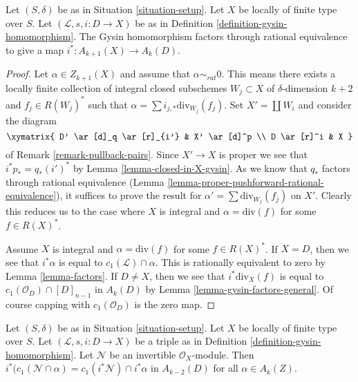 \begin{lemma}
\label{lemma-gysin-factors}
Let $(S, \delta)$ be as in Situation \ref{situation-setup}.
Let $X$ be locally of finite type over $S$.
Let $(\mathcal{L}, s, i : D \to X)$ be as in
Definition \ref{definition-gysin-homomorphism}.
The Gysin homomorphism factors through rational equivalence to
give a map $i^* : A_{k + 1}(X) \to A_k(D)$.
\end{lemma}

\begin{proof}
Let $\alpha \in Z_{k + 1}(X)$ and assume that $\alpha \sim_{rat} 0$.
This means there exists a locally finite collection of integral
closed subschemes $W_j \subset X$ of $\delta$-dimension $k + 2$
and $f_j \in R(W_j)^*$ such that
$\alpha = \sum i_{j, *}\text{div}_{W_j}(f_j)$.
Set $X' = \coprod W_i$ and consider the diagram
$$
\xymatrix{
D' \ar[d]_q \ar[r]_{i'} & X' \ar[d]^p \\
D \ar[r]^i & X
}
$$
of Remark \ref{remark-pullback-pairs}. Since $X' \to X$ is proper
we see that $i^*p_* = q_*(i')^*$ by Lemma \ref{lemma-closed-in-X-gysin}.
As we know that $q_*$ factors through rational equivalence
(Lemma \ref{lemma-proper-pushforward-rational-equivalence}), it suffices
to prove the result for $\alpha' = \sum \text{div}_{W_j}(f_j)$
on $X'$. Clearly this reduces us to the case where $X$ is integral
and $\alpha = \text{div}(f)$ for some $f \in R(X)^*$.

\medskip\noindent
Assume $X$ is integral and $\alpha = \text{div}(f)$ for some $f \in R(X)^*$.
If $X = D$, then we see that $i^*\alpha$ is equal
to $c_1(\mathcal{L}) \cap \alpha$.
This is rationally equivalent to zero by Lemma \ref{lemma-factors}.
If $D \not = X$, then we see that $i^*\text{div}_X(f)$ is equal to
$c_1(\mathcal{O}_D) \cap [D]_{n - 1}$ in $A_k(D)$ by
Lemma \ref{lemma-gysin-factors-general}. Of course
capping with $c_1(\mathcal{O}_D)$ is the zero map.
\end{proof}

\begin{lemma}
\label{lemma-gysin-commutes-cap-c1}
Let $(S, \delta)$ be as in Situation \ref{situation-setup}. Let $X$ be
locally of finite type over $S$. Let $(\mathcal{L}, s, i : D \to X)$
be a triple as in Definition \ref{definition-gysin-homomorphism}.
Let $\mathcal{N}$ be an invertible $\mathcal{O}_X$-module.
Then $i^*(c_1(\mathcal{N} \cap \alpha) = c_1(i^*\mathcal{N}) \cap i^*\alpha$
in $A_{k - 2}(D)$ for all $\alpha \in A_k(Z)$.
\end{lemma}

